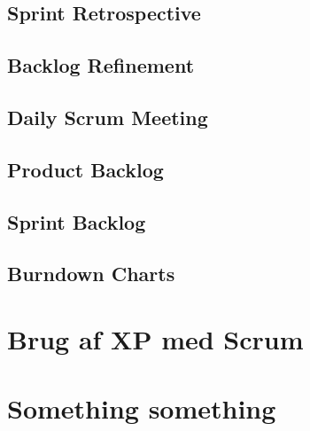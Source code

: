 \subsection{Sprint Retrospective}

\subsection{Backlog Refinement}


\subsection{Daily Scrum Meeting}


\subsection{Product Backlog}


\subsection{Sprint Backlog}



\subsection{Burndown Charts}





\section{Brug af XP med Scrum}



\section{Something something}